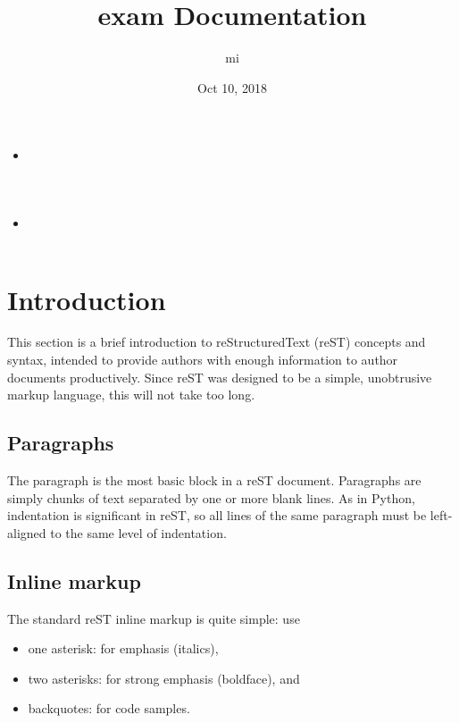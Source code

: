 \documentclass[letterpaper,10pt,english]{sphinxmanual}
\title{exam Documentation}
\date{Oct 10, 2018}
\author{mi}
\begin{document}
\maketitle
\sphinxtableofcontents
{}\label{\detokenize{index::doc}}
\begin{sphinxShadowBox}
\begin{itemize}
\item {} 
\label{\detokenize{index:id1}}{\hyperref[\detokenize{index:welcome-to-prueba-s-documentation}]{}}

\item {} 
\label{\detokenize{index:id2}}{\hyperref[\detokenize{index:index-and-tables}]{}}

\end{itemize}
\end{sphinxShadowBox}




\chapter{Introduction}
\label{\detokenize{usage/introduction:welcome-to-prueba-s-documentation}}\label{\detokenize{usage/introduction:introduction}}\label{\detokenize{usage/introduction::doc}}
This section is a brief introduction to reStructuredText (reST) concepts and
syntax, intended to provide authors with enough information to author documents
productively.  Since reST was designed to be a simple, unobtrusive markup
language, this will not take too long.


\section{Paragraphs}
\label{\detokenize{usage/introduction:paragraphs}}
The paragraph is the most basic block in a reST document.
Paragraphs are simply chunks of text separated by one or more blank lines.
As in Python, indentation is significant in reST,
so all lines of the same paragraph must be left-aligned to the same level of indentation.


\section{Inline markup}
\label{\detokenize{usage/introduction:inline-markup}}
The standard reST inline markup is quite simple: use
\begin{itemize}
\item {} 
one asterisk:  for emphasis (italics),

\item {} 
two asterisks:  for strong emphasis (boldface), and

\item {} 
backquotes:  for code samples.

\end{itemize}
\end{document}
